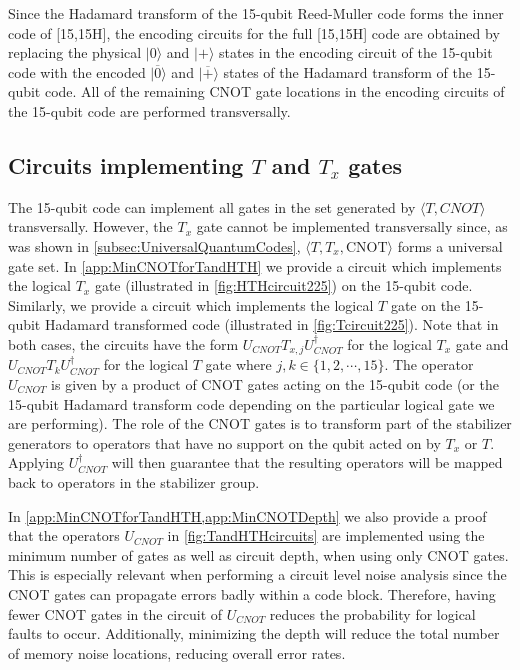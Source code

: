 \documentclass[pra,longbibliography,twocolumn,showpacs,nofootinbib,superscriptaddress,notitlepage]{revtex4-1}
\newcommand{\ket}[1]{|#1\rangle}  %
\begin{document}
Since the Hadamard transform of the 15-qubit Reed-Muller code forms the inner code of [15,15H], the encoding circuits for the full [15,15H] code are obtained by replacing the physical $\ket{0}$ and $\ket{+}$ states in the encoding circuit of the 15-qubit code with the encoded $\ket{\overline{0}}$ and $\ket{\overline{+}}$ states of the Hadamard transform of the 15-qubit code. All of the remaining CNOT gate locations in the encoding circuits of the 15-qubit code are performed transversally.

\subsection{Circuits implementing $T$ and $T_{x}$ gates}
\label{subsec:TandHTHcircuits}

The 15-qubit code can implement all gates in the set generated by $\langle T, CNOT \rangle$ transversally.  However, the $T_x$ gate cannot be implemented transversally since, as was shown in \cref{subsec:UniversalQuantumCodes}, $\langle T, T_x, \mathrm{CNOT} \rangle$ forms a universal gate set. In \cref{app:MinCNOTforTandHTH} we provide a circuit which implements the logical $T_x$ gate (illustrated in \cref{fig:HTHcircuit225}) on the 15-qubit code. Similarly, we provide a circuit which implements the logical $T$ gate on the 15-qubit Hadamard transformed code (illustrated in \cref{fig:Tcircuit225}). Note that in both cases, the circuits have the form $U_{CNOT}T_{x,j}U^{\dagger}_{CNOT}$ for the logical $T_x$ gate and $U_{CNOT}T_{k}U^{\dagger}_{CNOT}$ for the logical $T$ gate where $j,k \in \{1,2, \cdots , 15 \}$. The operator $U_{CNOT}$ is given by a product of CNOT gates acting on the 15-qubit code (or the 15-qubit Hadamard transform code depending on the particular logical gate we are performing). The role of the CNOT gates is to transform part of the stabilizer generators to operators that have no support on the qubit acted on by $T_x$ or $T$. Applying $U^{\dagger}_{CNOT}$ will then guarantee that the resulting operators will be mapped back to operators in the stabilizer group. 

In \cref{app:MinCNOTforTandHTH,app:MinCNOTDepth} we also provide a proof that the operators $U_{CNOT}$ in \cref{fig:TandHTHcircuits} are implemented using the minimum number of gates as well as circuit depth, when using only CNOT gates. This is especially relevant when performing a circuit level noise analysis since the CNOT gates can propagate errors badly within a code block. Therefore, having fewer CNOT gates in the circuit of $U_{CNOT}$ reduces the probability for logical faults to occur. Additionally, minimizing the depth will reduce the total number of memory noise locations, reducing overall error rates.
\end{document}

